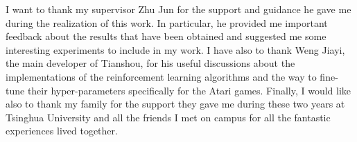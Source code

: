 \begin{acknowledgements}
I want to thank my supervisor Zhu Jun for the support and guidance he gave me during the realization of this work. In particular, he provided me important feedback about the results that have been obtained and suggested me some interesting experiments to include in my work. I have also to thank Weng Jiayi, the main developer of Tianshou, for his useful discussions about the implementations of the reinforcement learning algorithms and the way to fine-tune their hyper-parameters specifically for the Atari games. Finally, I would like also to thank my family for the support they gave me during these two years at Tsinghua University and all the friends I met on campus for all the fantastic experiences lived together.
  
\end{acknowledgements}